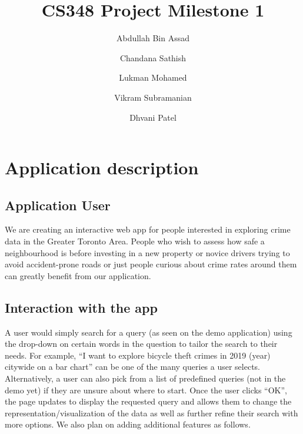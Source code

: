 \documentclass[12pt, a4paper]{article}
\title{CS348 Project Milestone 1}
\author{Abdullah Bin Assad\and Chandana Sathish \and Lukman Mohamed \and Vikram Subramanian \and Dhvani Patel}
\begin{document}
\maketitle

\section*{Application description}
\subsection*{Application User}
We are creating an interactive web app for people interested in exploring crime data in the Greater Toronto Area. People who wish to assess how safe a neighbourhood is before investing in a new property or novice drivers trying to avoid accident-prone roads or just people curious about crime rates around them can greatly benefit from our application.
\subsection*{Interaction with the app}
A user would simply search for a query (as seen on the demo application) using the drop-down on certain words in the question to tailor the search to their needs. For example, “I want to explore bicycle theft crimes in 2019 (year) citywide on a bar chart” can be one of the many queries a user selects. Alternatively, a user can also pick from a list of predefined queries (not in the demo yet) if they are unsure about where to start. Once the user clicks “OK”, the page updates to display the requested query and allows them to change the representation/visualization of the data as well as further refine their search with more options. We also plan on adding additional features as follows.
\end{document}
